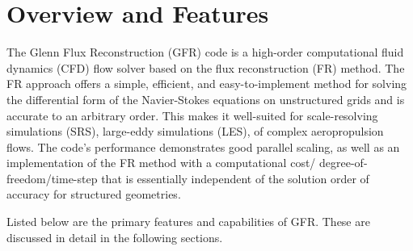 \section{Overview and Features}

The Glenn Flux Reconstruction (GFR) code is a high-order computational fluid
dynamics (CFD) flow solver based on the flux reconstruction (FR)
method\cite{Huynh_2007}.
%
%
The FR approach offers a simple, efficient, and easy-to-implement method for
solving the differential form of the Navier-Stokes equations on unstructured
grids and is accurate to an arbitrary order\cite{Huynh_2007, Huynh_2009,
Huynh_2011, Vincent_2011, Castonguay_2012, Huynh_2014, Vincent_2015}.
%
This makes it well-suited for scale-resolving simulations (SRS), \forexample
large-eddy simulations (LES), of complex aeropropulsion flows.
%
The code’s performance demonstrates good parallel scaling, as well as an
implementation of the FR method with a computational cost\slash
degree-of-freedom\slash time-step that is essentially independent of the
solution order of accuracy for structured geometries.\cite{Spiegel_2016}


Listed below are the primary features and capabilities of GFR.
These are discussed in detail in the following sections.




